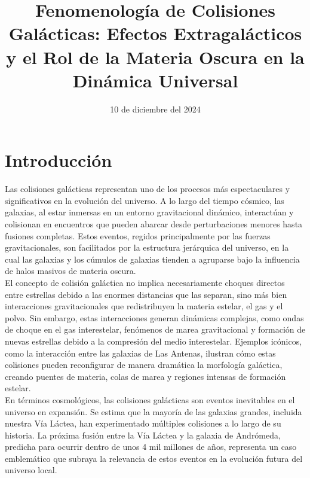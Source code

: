 \documentclass{article}
\date{10 de diciembre del 2024}
\begin{document}




\title{Fenomenología de Colisiones Galácticas: Efectos Extragalácticos y el Rol de la Materia Oscura en la Dinámica Universal}
\maketitle

\section*{Introducción}
Las colisiones galácticas representan uno de los procesos más espectaculares y significativos en la evolución del universo. A lo largo del tiempo cósmico, las galaxias, al estar inmersas en un entorno gravitacional dinámico, interactúan y colisionan en encuentros que pueden abarcar desde perturbaciones menores hasta fusiones completas. Estos eventos, regidos principalmente por las fuerzas gravitacionales, son facilitados por la estructura jerárquica del universo, en la cual las galaxias y los cúmulos de galaxias tienden a agruparse bajo la influencia de halos masivos de materia oscura. \\

El concepto de colisión galáctica no implica necesariamente choques directos entre estrellas debido a las enormes distancias que las separan, sino más bien interacciones gravitacionales que redistribuyen la materia estelar, el gas y el polvo. Sin embargo, estas interacciones generan dinámicas complejas, como ondas de choque en el gas interestelar, fenómenos de marea gravitacional y formación de nuevas estrellas debido a la compresión del medio interestelar. Ejemplos icónicos, como la interacción entre las galaxias de Las Antenas, ilustran cómo estas colisiones pueden reconfigurar de manera dramática la morfología galáctica, creando puentes de materia, colas de marea y regiones intensas de formación estelar. \\

En términos cosmológicos, las colisiones galácticas son eventos inevitables en el universo en expansión. Se estima que la mayoría de las galaxias grandes, incluida nuestra Vía Láctea, han experimentado múltiples colisiones a lo largo de su historia. La próxima fusión entre la Vía Láctea y la galaxia de Andrómeda, predicha para ocurrir dentro de unos 4 mil millones de años, representa un caso emblemático que subraya la relevancia de estos eventos en la evolución futura del universo local. \\
\end{document}
